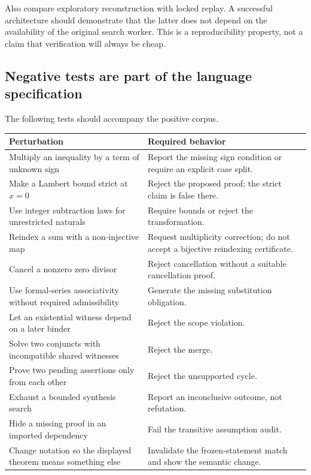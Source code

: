 \documentclass[11pt,a4paper]{article}
\begin{document}
Also compare exploratory reconstruction with locked replay. A successful architecture should demonstrate that the latter does not depend on the availability of the original search worker. This is a reproducibility property, not a claim that verification will always be cheap.

\subsection{Negative tests are part of the language specification}

The following tests should accompany the positive corpus.
\begin{center}
\small
\begin{tabularx}{\textwidth}{@{}>{\raggedright\arraybackslash}p{}Y@{}}
\toprule
Perturbation & Required behavior \\
\midrule
Multiply an inequality by a term of unknown sign & Report the missing sign condition or require an explicit case split. \\
Make a Lambert bound strict at $x=0$ & Reject the proposed proof; the strict claim is false there. \\
Use integer subtraction laws for unrestricted naturals & Require bounds or reject the transformation. \\
Reindex a sum with a non-injective map & Request multiplicity correction; do not accept a bijective reindexing certificate. \\
Cancel a nonzero zero divisor & Reject cancellation without a suitable cancellation proof. \\
Use formal-series associativity without required admissibility & Generate the missing substitution obligation. \\
Let an existential witness depend on a later binder & Reject the scope violation. \\
Solve two conjuncts with incompatible shared witnesses & Reject the merge. \\
Prove two pending assertions only from each other & Reject the unsupported cycle. \\
Exhaust a bounded synthesis search & Report an inconclusive outcome, not refutation. \\
Hide a missing proof in an imported dependency & Fail the transitive assumption audit. \\
Change notation so the displayed theorem means something else & Invalidate the frozen-statement match and show the semantic change. \\
\bottomrule
\end{tabularx}
\end{center}
\end{document}
